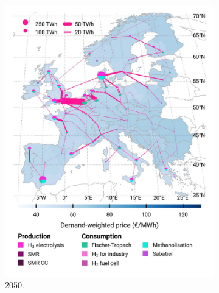 \documentclass[preprint,12pt,sort&compress]{elsarticle}
\begin{document}
\begin{figure}[htbp]
\begin{subfigure}[t]{0.33\textwidth}
    \includegraphics[width=1\textwidth]{maps/greenfield-pipelines/base_s_adm___2050-balance_map_H2}
    \caption{ 2050.}
    \label{fig:CP_lt_2050_h2}
  \end{subfigure}
  \begin{subfigure}[t]{0.33\textwidth}
      \vspace{0pt}

\end{subfigure}
\end{figure}
\end{document}
